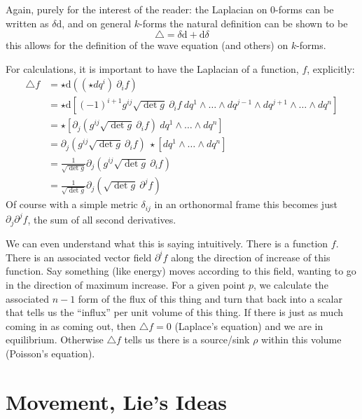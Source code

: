\documentclass[../master.tex]{subfiles}
\begin{document}
	Again, purely for the interest of the reader: the Laplacian on $0$-forms can be written as $\delta \mathrm d$, and on general $k$-forms the natural definition can be shown to be
		\begin{equation}
			\triangle = \delta \mathrm d + \mathrm d \delta
		\end{equation}
	this allows for the definition of the wave equation (and others) on $k$-forms.
	
	For calculations, it is important to have the Laplacian of a function, $f$, explicitly:
	\begin{align*}
		\triangle f &=   \star \mathrm d ((\star{dq^i}) ~ \partial_i f ) 
				\\&= \star \mathrm d \left[ (-1)^{i+1} g^{ij} \sqrt{\det g} ~ \partial_i f ~ dq^1 \wedge \dots \wedge dq^{j-1} \wedge  dq^{j+1} \wedge \dots \wedge dq^n \right]
				\\&= \star \left[ \partial_j (g^{ij} \sqrt{\det g} ~ \partial_i f ) ~ dq^1 \wedge \dots \wedge dq^n \right]
				\\&= \partial_j (g^{ij} \sqrt{\det g} ~ \partial_i f ) ~ \star\left[ dq^1 \wedge \dots \wedge dq^n\right]
				\\&= \frac{1}{\sqrt{\det g}} \partial_j (g^{ij} \sqrt{\det g} ~ \partial_i f )
				\\&= \frac{1}{\sqrt{\det g}} \partial_j \left(\sqrt{\det g}~ \partial^j f\right)
	\end{align*}
	Of course with a simple metric $\delta_{ij}$ in an orthonormal frame this becomes just $\partial_j \partial^j f$, the sum of all second derivatives.
	
	We can even understand what this is saying intuitively. There is a function $f$. There is an associated vector field $\partial^i f$ along the direction of increase of this function. Say something (like energy) moves according to this field, wanting to go in the direction of maximum increase. For a given point $p$, we calculate the associated $n-1$ form of the flux of this thing and turn that back into a scalar that tells us the ``influx'' per unit volume of this thing. If there is just as much coming in as coming out, then $\triangle f = 0$ (Laplace's equation) and we are in equilibrium. Otherwise $\triangle f$ tells us there is a source/sink $\rho$ within this volume (Poisson's equation). 
	

	\section{Movement, Lie's Ideas}
\end{document}
